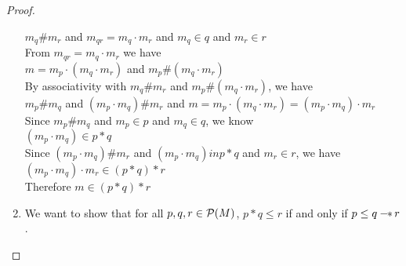 \begin{proof}
\begin{enumerate}
\begin{tabbedproof}
    \ooooox $m_q \# m_{r}$ and $m_{qr} = m_q \cdot m_r$ and $m_q \in q$ and $m_r \in r$ \\
    \ooooo From $m_{qr} = m_q \cdot m_r$ we have \\
    \ooooox $m = m_p \cdot (m_q \cdot m_r)$ and $m_p \# (m_q \cdot m_r)$ \\
    \ooooo By associativity with $m_q \# m_{r}$ and $m_p \# (m_q \cdot m_r)$, we have \\
    \ooooox $m_p \# m_q$ and $(m_p \cdot m_q) \# m_r$ and 
            $m = m_p \cdot (m_q \cdot m_r) = (m_p \cdot m_q) \cdot m_r$ \\
    \ooooo Since $m_p \# m_q$ and $m_p \in p$ and $m_q \in q$, we know \\
    \ooooox $(m_p \cdot m_q) \in p * q$ \\
    \ooooo Since $(m_p \cdot m_q) \# m_r$ and $(m_p \cdot m_q) in p * q$ and $m_r \in r$, we have \\ 
    \ooooox $(m_p \cdot m_q) \cdot m_r \in (p * q) * r$ \\
    \ooooo Therefore $m \in (p * q) * r$ \\
  \end{tabbedproof}

\item We want to show that for all $p, q, r \in \mathcal{P}(M)$, $p * q \leq r$ if and
only if $p \leq q -\!\!*\, r$. 


\end{enumerate}
\end{proof}
